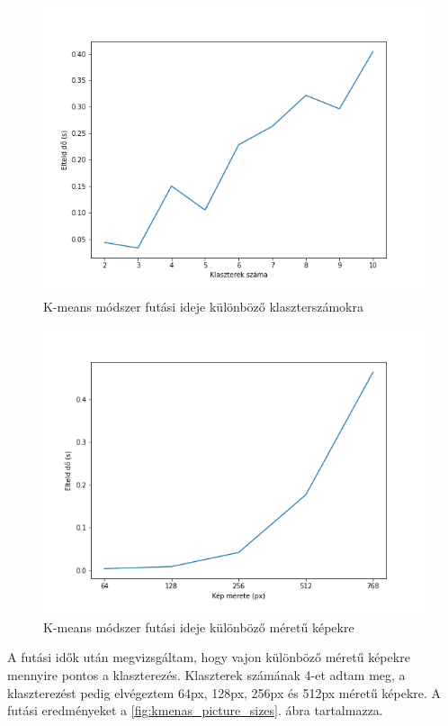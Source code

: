 \begin{figure}[h]
\centering
\includegraphics[scale=0.7]{images/kmeans_runtime_cluster.png}
\caption{K-means módszer futási ideje különböző klaszterszámokra}
\label{fig:kmenas_runtime_cluster}
\end{figure}

\begin{figure}[h]
\centering
\includegraphics[scale=0.7]{images/kmeans_runtime_size.png}
\caption{K-means módszer futási ideje különböző méretű képekre}
\label{fig:kmenas_runtime_size}
\end{figure}

A futási idők után megvizsgáltam, hogy vajon különböző méretű képekre mennyire pontos a klaszterezés. Klaszterek számának 4-et adtam meg, a klaszterezést pedig elvégeztem 64px, 128px, 256px és 512px méretű képekre. A futási eredményeket a \ref{fig:kmenas_picture_sizes}. ábra tartalmazza.

